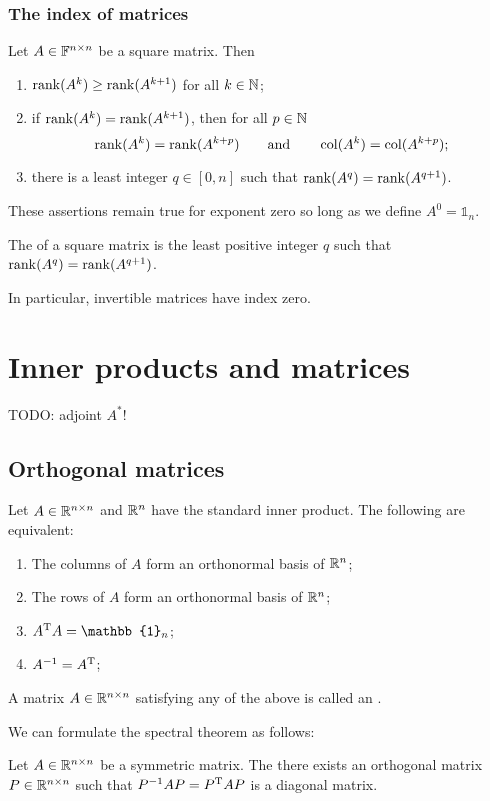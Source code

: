 \subsubsection{The index of matrices}
\begin{proposition}
Let $A\in\mathbb{F}^{n\times n}$ be a square matrix. Then
\begin{enumerate}
\item $\operatorname{rank}(A^k)\geq \operatorname{rank}(A^{k+1})$ for all $k\in\mathbb{N}$;
\item if $\operatorname{rank}(A^k) = \operatorname{rank}(A^{k+1})$, then for all $p\in\mathbb{N}$
\[ \operatorname{rank}(A^k) = \operatorname{rank}(A^{k+p}) \qquad\text{and}\qquad \operatorname{col}(A^k) = \operatorname{col}(A^{k+p}); \]
\item there is a least integer $q\in [0,n]$ such that $\operatorname{rank}(A^q) = \operatorname{rank}(A^{q+1})$.
\end{enumerate}
\end{proposition}
These assertions remain true for exponent zero so long as we define $A^0 = \mathbb{1}_n$.

\begin{definition}
The  of a square matrix is the least positive integer $q$ such that $\operatorname{rank}(A^q) = \operatorname{rank}(A^{q+1})$.
\end{definition}
In particular, invertible matrices have index zero.

\section{Inner products and matrices}
TODO: adjoint $A^*$!
\subsection{Orthogonal matrices}
\begin{proposition}
Let $A\in\mathbb{R}^{n\times n}$ and $\mathbb{R}^n$ have the standard inner product. The following are equivalent:
\begin{enumerate}
\item The columns of $A$ form an orthonormal basis of $\mathbb{R}^n$;
\item The rows of $A$ form an orthonormal basis of $\mathbb{R}^n$;
\item $A^\transp A = \mathbb{1}_n$;
\item $A^{-1} = A^{\mathrm{T}}$;
\end{enumerate}
\end{proposition}
\begin{definition}
A matrix $A\in\mathbb{R}^{n\times n}$ satisfying any of the above is called an .
\end{definition}
We can formulate the spectral theorem as follows:
\begin{proposition}
Let $A\in\mathbb{R}^{n\times n}$ be a symmetric matrix. The there exists an orthogonal matrix $P\in \mathbb{R}^{n\times n}$ such that $P^{-1}AP = P^{\mathrm{T}} A P$ is a diagonal matrix.
\end{proposition}

